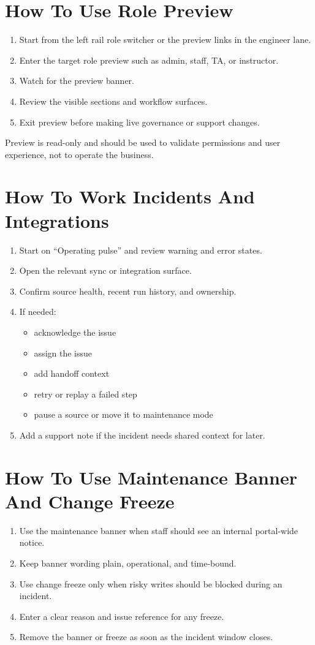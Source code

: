 \documentclass[11pt]{article}
\begin{document}
\section*{How To Use Role Preview}
\begin{enumerate}
  \item Start from the left rail role switcher or the preview links in the engineer lane.
  \item Enter the target role preview such as admin, staff, TA, or instructor.
  \item Watch for the preview banner.
  \item Review the visible sections and workflow surfaces.
  \item Exit preview before making live governance or support changes.
\end{enumerate}

Preview is read-only and should be used to validate permissions and user experience, not to operate the business.

\section*{How To Work Incidents And Integrations}
\begin{enumerate}
  \item Start on ``Operating pulse'' and review warning and error states.
  \item Open the relevant sync or integration surface.
  \item Confirm source health, recent run history, and ownership.
  \item If needed:
  \begin{itemize}
    \item acknowledge the issue
    \item assign the issue
    \item add handoff context
    \item retry or replay a failed step
    \item pause a source or move it to maintenance mode
  \end{itemize}
  \item Add a support note if the incident needs shared context for later.
\end{enumerate}

\section*{How To Use Maintenance Banner And Change Freeze}
\begin{enumerate}
  \item Use the maintenance banner when staff should see an internal portal-wide notice.
  \item Keep banner wording plain, operational, and time-bound.
  \item Use change freeze only when risky writes should be blocked during an incident.
  \item Enter a clear reason and issue reference for any freeze.
  \item Remove the banner or freeze as soon as the incident window closes.
\end{enumerate}
\end{document}
